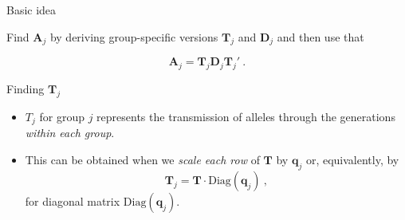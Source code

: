 \documentclass[10pt,ignorenonframetext,]{beamer}
\providecommand{\tightlist}{%
  \setlength{\itemsep}{0pt}\setlength{\parskip}{0pt}}
\begin{document}
\begin{frame}

\begin{block}{Basic idea}

\vspace{3mm}

Find \(\mathbf{A}_j\) by deriving group-specific versions
\(\mathbf{T}_j\) and \(\mathbf{D}_j\) and then use that

\[\mathbf{A}_j = \mathbf{T}_j \mathbf{D}_j \mathbf{T}_j ' \ .\]

\end{block}

\end{frame}

\begin{frame}

\begin{block}{Finding \(\mathbf{T}_j\)}

\vspace{3mm}

\begin{itemize}
\tightlist
\item
  \(T_j\) for group \(j\) represents the transmission of alleles through
  the generations \emph{within each group}.
\end{itemize}

\vspace{3mm}

\begin{itemize}
\tightlist
\item
  This can be obtained when we \emph{scale each row} of \(\mathbf{T}\)
  by \(\mathbf{q}_j\) or, equivalently, by
  \[\mathbf{T}_j = \mathbf{T} \cdot \text{Diag}(\mathbf{q}_j) \ , \] for
  diagonal matrix \(\text{Diag}(\mathbf{q}_j)\).
\end{itemize}

\end{block}

\end{frame}
\end{document}
